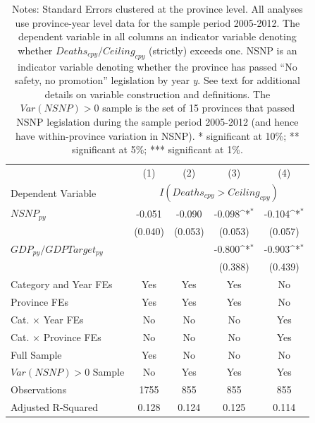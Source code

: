 \begin{table}[htbp]\centering\captionsetup{width=0.8\textwidth}\footnotesize{
\def\sym#1{\ifmmode^{#1}\else\(^{#1}\)\fi}
\caption{Table 2: No safety, no promotion laws and accidental deaths}
\begin{tabular}{l*{4}{c}}
\hline\hline
                    &\multicolumn{1}{c}{(1)}         &\multicolumn{1}{c}{(2)}         &\multicolumn{1}{c}{(3)}         &\multicolumn{1}{c}{(4)}         \\
Dependent Variable & \multicolumn{4}{c}{ $ I(Deaths_{cpy} > Ceiling_{cpy}) $ }  \\
\hline
 $ NSNP_{py} $      &      -0.051         &      -0.090         &      -0.098\sym{*}  &      -0.104\sym{*}  \\
                    &     (0.040)         &     (0.053)         &     (0.053)         &     (0.057)         \\
 $ GDP_{py}/GDPTarget_{py} $ &                     &                     &      -0.800\sym{*}  &      -0.903\sym{*}  \\
                    &                     &                     &     (0.388)         &     (0.439)         \\
\hline
Category and Year FEs            & Yes & Yes & Yes & No  \\
Province FEs                     & Yes & Yes & Yes & No  \\
Cat. $ \times $ Year FEs     & No  & No  & No  & Yes \\
Cat. $ \times $ Province FEs & No  & No  & No  & Yes \\
\hline
Full Sample                      & Yes & No  & No  & No  \\
 $ Var(NSNP)>0 $ Sample          & No  & Yes & Yes & Yes \\
\hline
Observations        &        1755         &         855         &         855         &         855         \\
Adjusted R-Squared  &       0.128         &       0.124         &       0.125         &       0.114         \\
\hline\hline
\end{tabular}}
\caption{Notes: Standard Errors clustered at the province level. All analyses use province-year level data for the sample period 2005-2012. The dependent variable in all columns an indicator variable denoting whether $ Deaths_{cpy}/Ceiling_{cpy} $ (strictly) exceeds one. NSNP is an indicator variable denoting whether the province has passed \enquote{No safety, no promotion} legislation by year \emph{y}. See text for additional details on variable construction and definitions. The $ Var(NSNP) > 0 $ sample is the set of 15 provinces that passed NSNP legislation during the sample period 2005-2012 (and hence have within-province variation in NSNP). * significant at 10\%; ** significant at 5\%; *** significant at 1\%. }
\end{table}
